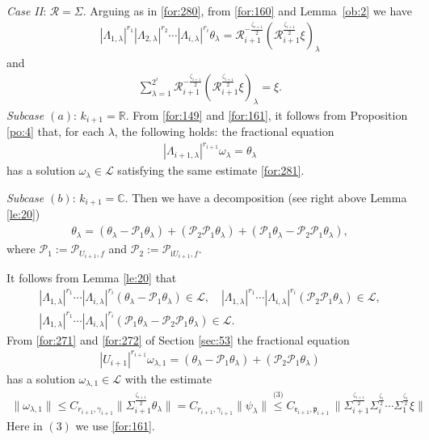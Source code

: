 \documentclass[11 pt]{amsart}
\newcommand{\RR}{\mathbb{R}}
\newcommand{\CC}{\mathbb{C}}
\newcommand{\norm}[1]{\lVert#1\rVert}
\theoremstyle{definition}
\numberwithin{equation}{section}
\begin{document}
  \emph{Case II}:  $\mathcal{R}=\Sigma$. Arguing as in \eqref{for:280}, from \eqref{for:160} and Lemma~\ref{ob:2} we have
  \begin{align}\label{for:88}
 |\Lambda_{1,\lambda}|^{r_1}|\Lambda_{2,\lambda}|^{r_2}\cdots |\Lambda_{i,\lambda}|^{r_i}\theta_\lambda=\mathcal{R}_{i+1}^{-\frac{\zeta_{i+1}}{2}}(\mathcal{R}_{i+1}^{\frac{\zeta_{i+1}}{2}}\xi)_\lambda
\end{align}
and
\begin{align*}
 \sum_{\lambda=1}^{2^i}\mathcal{R}_{i+1}^{-\frac{\zeta_{i+1}}{2}}(\mathcal{R}_{i+1}^{\frac{\zeta_{i+1}}{2}}\xi)_\lambda=\xi.
\end{align*}
\emph{Subcase $(a)$}:  $k_{i+1}=\RR$. From \eqref{for:149} and \eqref{for:161}, it follows from Proposition \ref{po:4} that, for each $\lambda$, the following holds:
the fractional equation
\begin{align*}
  |\Lambda_{i+1,\lambda}|^{r_{i+1}}\omega_{\lambda}=\theta_\lambda
\end{align*}
has a solution $\omega_{\lambda}\in \mathcal{L}$ satisfying the same estimate \eqref{for:281}.




\emph{Subcase $(b)$}: $k_{i+1}=\CC$. Then we have a decomposition (see right above Lemma \ref{le:20})
\begin{align*}
\theta_\lambda=(\theta_\lambda-\mathcal{P}_1\theta_\lambda)+(\mathcal{P}_2\mathcal{P}_1\theta_\lambda)+(\mathcal{P}_1\theta_\lambda-\mathcal{P}_2\mathcal{P}_1\theta_\lambda),
\end{align*}
where $\mathcal{P}_1:=\mathcal{P}_{U_{i+1},f}$ and $\mathcal{P}_2:=\mathcal{P}_{\mathrm{i}U_{i+1},f}$.

It follows from  Lemma \ref{le:20} that
\begin{gather*}
 |\Lambda_{1,\lambda}|^{r_1}\cdots |\Lambda_{i,\lambda}|^{r_i}
  (\theta_\lambda-\mathcal{P}_1\theta_\lambda)\in \mathcal{L}, \quad
  |\Lambda_{1,\lambda}|^{r_1}\cdots |\Lambda_{i,\lambda}|^{r_i}
  (\mathcal{P}_2\mathcal{P}_1\theta_\lambda)\in \mathcal{L},\\
  |\Lambda_{1,\lambda}|^{r_1}\cdots |\Lambda_{i,\lambda}|^{r_i}
  (\mathcal{P}_1\theta_\lambda-\mathcal{P}_2\mathcal{P}_1\theta_\lambda)\in \mathcal{L}.
\end{gather*}
 From \eqref{for:271} and \eqref{for:272} of Section \ref{sec:53} the fractional equation
\begin{align*}
    |U_{i+1}|^{r_{i+1}}\omega_{\lambda,1}=(\theta_\lambda-\mathcal{P}_1\theta_\lambda)+(\mathcal{P}_2\mathcal{P}_1\theta_\lambda)
  \end{align*}
  has a solution $\omega_{\lambda,1}\in \mathcal{L}$ with the estimate
  \begin{align*}
 \norm{\omega_{\lambda,1}}\leq C_{r_{i+1},\gamma_{i+1}}\big\|\Sigma_{i+1}^{\frac{\zeta_{i+1}}{2}}\theta_\lambda\big\|= C_{r_{i+1},\gamma_{i+1}}\|\psi_\lambda\|
    \overset{\text{(3)}}{\leq}C_{\mathfrak{r}_{i+1},\mathfrak{p}_{i+1}}\,
     \big\|\Sigma_{i+1}^{\frac{\zeta_{i+1}}{2}}\Sigma_i^{\frac{\zeta_i}{2}}\cdots\Sigma_1^{\frac{\zeta_1}{2}}\xi\big\|
\end{align*}
Here in $(3)$ we use \eqref{for:161}.
\end{document}
